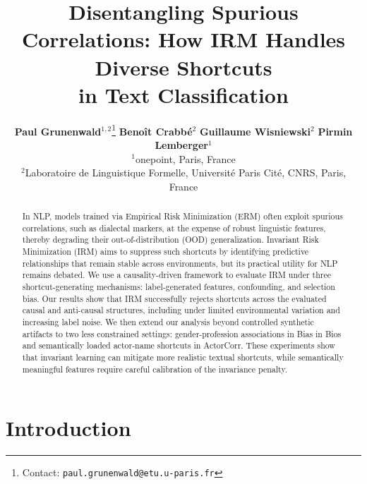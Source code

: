 \documentclass[11pt]{article}
\title{Disentangling Spurious Correlations: How IRM Handles Diverse Shortcuts \\ in Text Classification}
\author{
  \textbf{Paul Grunenwald}$^{1,2}$\thanks{\raggedright Contact: \texttt{paul.grunenwald@etu.u-paris.fr}} \quad 
  \textbf{Benoît Crabbé}$^2$ \quad 
  \textbf{Guillaume Wisniewski}$^2$ \quad 
  \textbf{Pirmin Lemberger}$^1$ \\
  $^1$onepoint, Paris, France \\
  $^2$Laboratoire de Linguistique Formelle, Université Paris Cité, CNRS, Paris, France
}
\theoremstyle{definition}
\theoremstyle{plain}
\begin{document}
\maketitle

\begin{abstract}
In NLP, models trained via Empirical Risk Minimization (ERM) often exploit spurious correlations, such as dialectal markers, at the expense of robust linguistic features, thereby degrading their out-of-distribution (OOD) generalization. Invariant Risk Minimization (IRM) aims to suppress such shortcuts by identifying predictive relationships that remain stable across environments, but its practical utility for NLP remains debated. We use a causality-driven framework to evaluate IRM under three shortcut-generating mechanisms: label-generated features, confounding, and selection bias. Our results show that IRM successfully rejects shortcuts across the evaluated causal and anti-causal structures, including under limited environmental variation and increasing label noise. We then extend our analysis beyond controlled synthetic artifacts to two less constrained settings: gender-profession associations in Bias in Bios and semantically loaded actor-name shortcuts in ActorCorr. These experiments show that invariant learning can mitigate more realistic textual shortcuts, while semantically meaningful features require careful calibration of the invariance penalty.
\end{abstract}


\section{Introduction}
\end{document}
